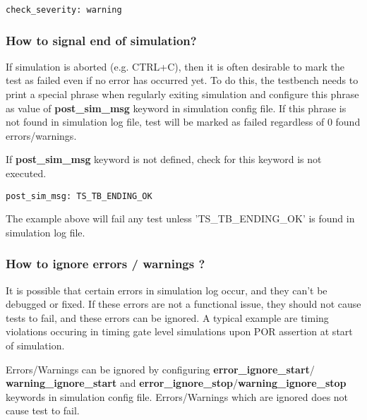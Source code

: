 \documentclass{tropic_design_spec}
\begin{document}
\begin{lstlisting}
check_severity: warning
\end{lstlisting}


\subsubsection{How to signal end of simulation?}
\label{sec:how-to-signal-end-of-simulation}

If simulation is aborted (e.g. CTRL+C), then it is often desirable to mark the test
as failed even if no error has occurred yet. To do this, the testbench needs to print
a special phrase when regularly exiting simulation and configure this phrase as value
of \textbf{post_sim_msg} keyword in simulation config file. If this phrase is not found
in simulation log file, test will be marked as failed regardless of 0 found errors/warnings.

If \textbf{post_sim_msg} keyword is not defined, check for this keyword is not executed.

\begin{lstlisting}
post_sim_msg: TS_TB_ENDING_OK
\end{lstlisting}

The example above will fail any test unless 'TS_TB_ENDING_OK' is found in simulation
log file.


\subsubsection{How to ignore errors / warnings ?}
\label{sec:how-to-ignore-errors-warnings}

It is possible that certain errors in simulation log occur, and they can't be debugged or
fixed. If these errors are not a functional issue, they should not cause tests to fail,
and these errors can be ignored. A typical example are timing violations occuring in
timing gate level simulations upon POR assertion at start of simulation.

Errors/Warnings can be ignored by configuring \textbf{error_ignore_start}/
\textbf{warning_ignore_start} and \textbf{error_ignore_stop}/\textbf{warning_ignore_stop}
keywords in simulation config file. Errors/Warnings which are ignored does not cause
test to fail.
\end{document}
